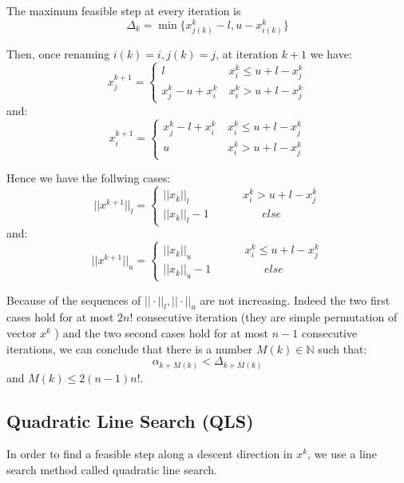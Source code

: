 The maximum feasible step at every iteration is
\begin{equation}
\Delta_k= \min \{ x^k_{j(k)}-l, u-x^k_{i(k)}\}
\end{equation}

Then, once renaming $i(k)=i,j(k)=j$, at iteration $k+1$ we have:
\begin{equation*}
x^{k+1}_{j}=\begin{cases}
 l \ &x^k_{i}\le u+l-x^k_{j}\\
 x^k_{j}-u+x^k_{i} \ &x^k_{i}> u+l-x^k_{j}
 \end{cases}
\end{equation*}
and:
\begin{equation*}
x^{k+1}_{i}=\begin{cases}
 x^k_{j}-l+x^k_{i} \ &x^k_{i}\le u+l-x^k_{j}\\
 u \ &x^k_{i}> u+l-x^k_{j}
 \end{cases}
\end{equation*}

Hence we have the follwing cases:
\begin{equation}
 ||x^{k+1}||_l=\begin{cases} ||x_{k}||_l\hspace{2cm} x^k_{i}> u+l-x^k_{j} \\
 ||x_k||_l-1\hspace{2cm} else               
              \end{cases}
\end{equation}
and:
\begin{equation}
 ||x^{k+1}||_u=\begin{cases} ||x_{k}||_u\hspace{2cm} x^k_{i}\le u+l-x^k_{j} \\
 ||x_k||_u-1\hspace{2cm} else               
              \end{cases}
\end{equation}

Because of the sequences of $||\cdot||_l, ||\cdot||_u$ are not increasing.
Indeed the two first cases hold for at most $2n!$ consecutive iteration (they are simple permutation of vector $x^k$ ) and the two second cases hold for at most $n-1$ consecutive iterations,
we can conclude that there is a number $M(k) \in \mathbb{N}$ such that:
\begin{equation}
 \alpha_{k+M(k)} < \Delta_{k+M(k)}
\end{equation}
and $M(k)\le 2(n-1)n!$.
\fi
\subsection{Quadratic Line Search (QLS)}
In order to find a feasible step along a descent direction in $x^k$, we use a line search method called quadratic line search.

